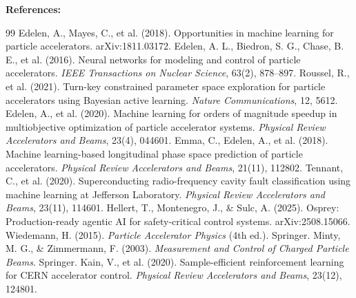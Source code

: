 \documentclass[11pt,a4paper]{article}
\begin{document}
\vspace{1.5em}
\noindent\textbf{References:}
\begin{small}
\begin{thebibliography}{99}
     Edelen, A., Mayes, C., et al. (2018). Opportunities in machine learning for particle accelerators. arXiv:1811.03172.
     Edelen, A. L., Biedron, S. G., Chase, B. E., et al. (2016). Neural networks for modeling and control of particle accelerators. \textit{IEEE Transactions on Nuclear Science}, 63(2), 878--897.
     Roussel, R., et al. (2021). Turn-key constrained parameter space exploration for particle accelerators using Bayesian active learning. \textit{Nature Communications}, 12, 5612.
     Edelen, A., et al. (2020). Machine learning for orders of magnitude speedup in multiobjective optimization of particle accelerator systems. \textit{Physical Review Accelerators and Beams}, 23(4), 044601.
     Emma, C., Edelen, A., et al. (2018). Machine learning-based longitudinal phase space prediction of particle accelerators. \textit{Physical Review Accelerators and Beams}, 21(11), 112802.
     Tennant, C., et al. (2020). Superconducting radio-frequency cavity fault classification using machine learning at Jefferson Laboratory. \textit{Physical Review Accelerators and Beams}, 23(11), 114601.
     Hellert, T., Montenegro, J., \& Sulc, A. (2025). Osprey: Production-ready agentic AI for safety-critical control systems. arXiv:2508.15066.
     Wiedemann, H. (2015). \textit{Particle Accelerator Physics} (4th ed.). Springer.
     Minty, M. G., \& Zimmermann, F. (2003). \textit{Measurement and Control of Charged Particle Beams}. Springer.
     Kain, V., et al. (2020). Sample-efficient reinforcement learning for CERN accelerator control. \textit{Physical Review Accelerators and Beams}, 23(12), 124801.
\end{thebibliography}
\end{small}
\end{document}
